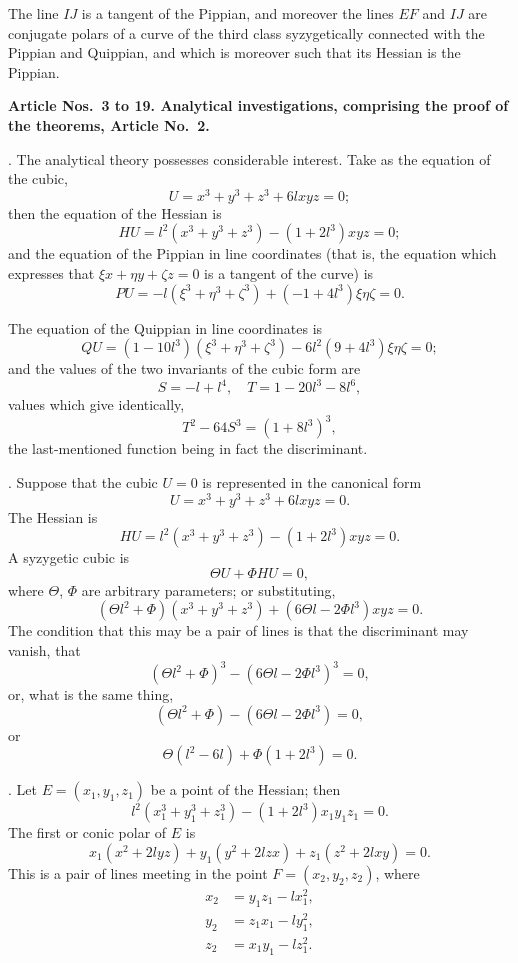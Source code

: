 \documentclass[11pt,a4paper]{book}
\begin{document}
\begin{center}
The line $IJ$ is a tangent of the Pippian, and moreover the
lines $EF$ and $IJ$ are conjugate polars of a curve of the third
class syzygetically connected with the Pippian and Quippian,
and which is moreover such that its Hessian is the Pippian.

\medskip\noindent\textbf{Article Nos.~3 to 19. Analytical investigations, comprising
the proof of the theorems, Article No.~2.}

. The analytical theory possesses considerable interest.
Take as the equation of the cubic,
\[
U = x^{3} + y^{3} + z^{3} + 6lxyz = 0;
\]
then the equation of the Hessian is
\[
HU = l^{2}(x^{3} + y^{3} + z^{3}) - (1 + 2l^{3})xyz = 0;
\]
and the equation of the Pippian in line coordinates (that is,
the equation which expresses that $\xi x + \eta y + \zeta z = 0$
is a tangent of the curve) is
\[
PU = -l(\xi^{3} + \eta^{3} + \zeta^{3}) + (-1 + 4l^{3})\xi\eta\zeta = 0.
\]

The equation of the Quippian in line coordinates is
\[
QU = (1 - 10l^{3})(\xi^{3} + \eta^{3} + \zeta^{3}) - 6l^{2}(9 + 4l^{3})\xi\eta\zeta = 0;
\]
and the values of the two invariants of the cubic form are
\[
S = -l + l^{4}, \quad T = 1 - 20l^{3} - 8l^{6},
\]
values which give identically,
\[
T^{2} - 64S^{3} = (1 + 8l^{3})^{3},
\]
the last-mentioned function being in fact the discriminant.

. Suppose that the cubic $U = 0$ is represented in the
canonical form
\[
U = x^{3} + y^{3} + z^{3} + 6lxyz = 0.
\]
The Hessian is
\[
HU = l^{2}(x^{3} + y^{3} + z^{3}) - (1 + 2l^{3})xyz = 0.
\]
A syzygetic cubic is
\[
\Theta U + \Phi HU = 0,
\]
where $\Theta$, $\Phi$ are arbitrary parameters; or substituting,
\[
(\Theta l^{2} + \Phi)(x^{3} + y^{3} + z^{3}) + (6\Theta l - 2\Phi l^{3})xyz = 0.
\]
The condition that this may be a pair of lines is that the
discriminant may vanish, \ie{} that
\[
(\Theta l^{2} + \Phi)^{3} - (6\Theta l - 2\Phi l^{3})^{3} = 0,
\]
or, what is the same thing,
\[
(\Theta l^{2} + \Phi) - (6\Theta l - 2\Phi l^{3}) = 0,
\]
or
\[
\Theta(l^{2} - 6l) + \Phi(1 + 2l^{3}) = 0.
\]

. Let $E = (x_{1}, y_{1}, z_{1})$ be a point of the Hessian; then
\[
l^{2}(x_{1}^{3} + y_{1}^{3} + z_{1}^{3}) - (1 + 2l^{3})x_{1}y_{1}z_{1} = 0.
\]
The first or conic polar of $E$ is
\[
x_{1}(x^{2} + 2lyz) + y_{1}(y^{2} + 2lzx) + z_{1}(z^{2} + 2lxy) = 0.
\]
This is a pair of lines meeting in the point $F = (x_{2}, y_{2}, z_{2})$,
where
\begin{align*}
x_{2} &= y_{1}z_{1} - lx_{1}^{2}, \\
y_{2} &= z_{1}x_{1} - ly_{1}^{2}, \\
z_{2} &= x_{1}y_{1} - lz_{1}^{2}.
\end{align*}


\end{center}
\end{document}
